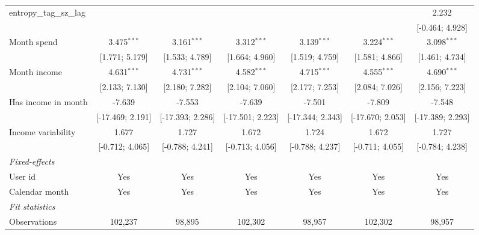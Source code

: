 \begin{table}[htbp]
\begin{threeparttable}[b]
\begin{tabular}{lcccccc}
         entropy\_tag\_sz\_lag            &                  &                  &                  &                  &                  & 2.232\\   
                                          &                  &                  &                  &                  &                  & [-0.464; 4.928]\\   
         Month spend                      & 3.475$^{***}$    & 3.161$^{***}$    & 3.312$^{***}$    & 3.139$^{***}$    & 3.224$^{***}$    & 3.098$^{***}$\\   
                                          & [1.771; 5.179]   & [1.533; 4.789]   & [1.664; 4.960]   & [1.519; 4.759]   & [1.581; 4.866]   & [1.461; 4.734]\\   
         Month income                     & 4.631$^{***}$    & 4.731$^{***}$    & 4.582$^{***}$    & 4.715$^{***}$    & 4.555$^{***}$    & 4.690$^{***}$\\   
                                          & [2.133; 7.130]   & [2.180; 7.282]   & [2.104; 7.060]   & [2.177; 7.253]   & [2.084; 7.026]   & [2.156; 7.223]\\   
         Has income in month              & -7.639           & -7.553           & -7.639           & -7.501           & -7.809           & -7.548\\   
                                          & [-17.469; 2.191] & [-17.393; 2.286] & [-17.501; 2.223] & [-17.344; 2.343] & [-17.670; 2.053] & [-17.389; 2.293]\\   
         Income variability               & 1.677            & 1.727            & 1.672            & 1.724            & 1.672            & 1.727\\   
                                          & [-0.712; 4.065]  & [-0.788; 4.241]  & [-0.713; 4.056]  & [-0.788; 4.237]  & [-0.711; 4.055]  & [-0.784; 4.238]\\   
         \midrule
         \emph{Fixed-effects}\\
         User id                          & Yes              & Yes              & Yes              & Yes              & Yes              & Yes\\  
         Calendar month                   & Yes              & Yes              & Yes              & Yes              & Yes              & Yes\\  
         \midrule
         \emph{Fit statistics}\\
         Observations                     & 102,237          & 98,895           & 102,302          & 98,957           & 102,302          & 98,957\\  

\end{tabular}
\end{threeparttable}
\end{table}
